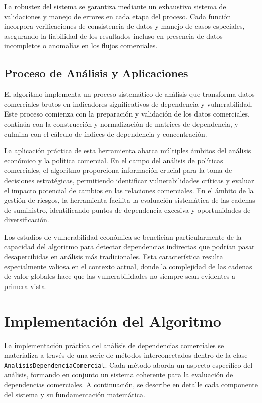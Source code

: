 \documentclass[authoryear]{elsarticle}
\begin{document}
La robustez del sistema se garantiza mediante un exhaustivo sistema de validaciones y manejo de errores en cada etapa del proceso. Cada función incorpora verificaciones de consistencia de datos y manejo de casos especiales, asegurando la fiabilidad de los resultados incluso en presencia de datos incompletos o anomalías en los flujos comerciales.

\subsection{Proceso de Análisis y Aplicaciones}

El algoritmo implementa un proceso sistemático de análisis que transforma datos comerciales brutos en indicadores significativos de dependencia y vulnerabilidad. Este proceso comienza con la preparación y validación de los datos comerciales, continúa con la construcción y normalización de matrices de dependencia, y culmina con el cálculo de índices de dependencia y concentración.

La aplicación práctica de esta herramienta abarca múltiples ámbitos del análisis económico y la política comercial. En el campo del análisis de políticas comerciales, el algoritmo proporciona información crucial para la toma de decisiones estratégicas, permitiendo identificar vulnerabilidades críticas y evaluar el impacto potencial de cambios en las relaciones comerciales. En el ámbito de la gestión de riesgos, la herramienta facilita la evaluación sistemática de las cadenas de suministro, identificando puntos de dependencia excesiva y oportunidades de diversificación.

Los estudios de vulnerabilidad económica se benefician particularmente de la capacidad del algoritmo para detectar dependencias indirectas que podrían pasar desapercibidas en análisis más tradicionales. Esta característica resulta especialmente valiosa en el contexto actual, donde la complejidad de las cadenas de valor globales hace que las vulnerabilidades no siempre sean evidentes a primera vista.

\section{Implementación del Algoritmo}

La implementación práctica del análisis de dependencias comerciales se materializa a través de una serie de métodos interconectados dentro de la clase \texttt{AnalisisDependenciaComercial}. Cada método aborda un aspecto específico del análisis, formando en conjunto un sistema coherente para la evaluación de dependencias comerciales. A continuación, se describe en detalle cada componente del sistema y su fundamentación matemática.
\end{document}
